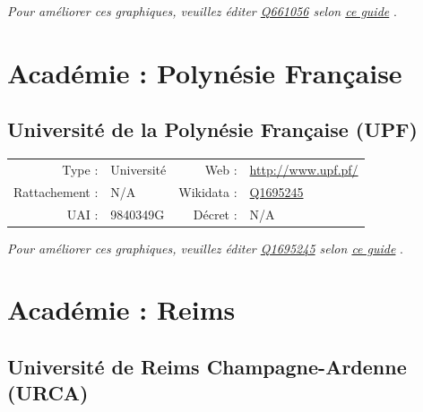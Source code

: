 \documentclass[11pt,french,landscape]{article}
\begin{document}
\textit{\scriptsize Pour améliorer ces graphiques, veuillez éditer \href{https://www.wikidata.org/entity/Q661056}{Q661056}  selon \href{https://github.com/cpesr/wikidataESR/blob/master/Rmd/wikidataESR.md}{ce guide}}
.


\newpage

\hypertarget{acaduxe9mie-polynuxe9sie-franuxe7aise}{%
\section{Académie : Polynésie
Française}\label{acaduxe9mie-polynuxe9sie-franuxe7aise}}

\hypertarget{universituxe9-de-la-polynuxe9sie-franuxe7aise-upf}{%
\subsection{Université de la Polynésie Française
(UPF)}\label{universituxe9-de-la-polynuxe9sie-franuxe7aise-upf}}

\begin{tabular*}{0.45\textwidth}{rp{2cm}rl}  
\hline  
Type : & Université & Web : &\href{http://www.upf.pf/}{http://www.upf.pf/} \\  
Rattachement : & N/A & Wikidata : & \href{https://www.wikidata.org/entity/Q1695245}{Q1695245} \\  
UAI : & 9840349G & Décret : & N/A \\  
\hline  
\end{tabular*}

\textit{\scriptsize Pour améliorer ces graphiques, veuillez éditer \href{https://www.wikidata.org/entity/Q1695245}{Q1695245}  selon \href{https://github.com/cpesr/wikidataESR/blob/master/Rmd/wikidataESR.md}{ce guide}}
.


\newpage

\hypertarget{acaduxe9mie-reims}{%
\section{Académie : Reims}\label{acaduxe9mie-reims}}

\hypertarget{universituxe9-de-reims-champagne-ardenne-urca}{%
\subsection{Université de Reims Champagne-Ardenne
(URCA)}\label{universituxe9-de-reims-champagne-ardenne-urca}}
\end{document}
